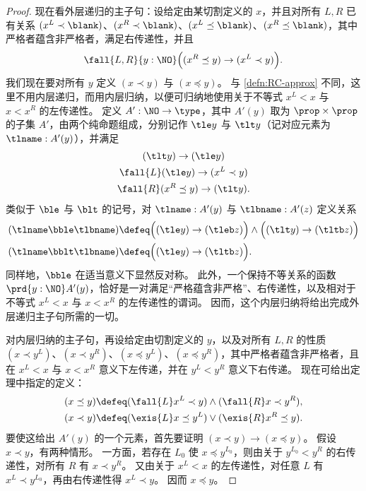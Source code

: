 \begin{proof}
  现在看外层递归的主子句：设给定由某切割定义的 $x$，并且对所有 $L,R$ 已有关系 $(x^L \prec \blank)$、$(x^R \prec \blank)$、$(x^L \preceq \blank)$、$(x^R \preceq \blank)$，其中严格者蕴含非严格者，满足右传递性，并且
  \begin{equation}\label{eq:NO-prec-outer-IH}
    \fall{L,R}{y:\NO}\Big( (x^R\preceq y) \to (x^L \prec y) \Big).
  \end{equation}
  我们现在要对所有 $y$ 定义 $(x\prec y)$ 与 $(x\preceq y)$。
  与 \cref{defn:RC-approx} 不同，这里不用内层递归，而用内层归纳，以便可归纳地使用关于不等式 $x^L<x$ 与 $x<x^R$ 的左传递性。
  定义 $A':\NO\to\type$，其中 $A'(y)$ 取为 $\prop\times\prop$ 的子集 $A'$，由两个纯命题组成，分别记作 $\tle y$ 与 $\tlt y$（记对应元素为 $\tlname:A'(y)$），并满足
  \begin{gather}
    (\tlt y) \to (\tle y)\\
    \fall{L} (\tle y)\to (x^L\prec y) \label{eq:NO-prec-IHL}\\
    \fall{R} (x^R \preceq y) \to (\tlt y) \label{eq:NO-prec-IHR}.
  \end{gather}
  类似于 $\ble$ 与 $\blt$ 的记号，对 $\tlname:A'(y)$ 与 $\tlbname:A'(z)$ 定义关系
  \begin{align*}
    (\tlname \bble \tlbname) &\defeq
    \Big((\tle y) \to (\tleb z)\Big) \land \Big((\tlt y) \to (\tltb z)\Big)\\
    (\tlname \bblt \tlbname) &\defeq
    \Big((\tle y) \to (\tltb z)\Big). %
  \end{align*}
  同样地，$\bble$ 在适当意义下显然反对称。
  此外，一个保持不等关系的函数 $\prd{y:\NO} A'(y)$，恰好是一对满足“严格蕴含非严格”、右传递性，以及相对于不等式 $x^L<x$ 与 $x<x^R$ 的左传递性的谓词。
  因而，这个内层归纳将给出完成外层递归主子句所需的一切。

  对内层归纳的主子句，再设给定由切割定义的 $y$，以及对所有 $L,R$ 的性质 $(x\prec y^L)$、$(x\prec y^R)$、$(x\preceq y^L)$、$(x\preceq y^R)$，其中严格者蕴含非严格者，且在 $x^L<x$ 与 $x<x^R$ 意义下左传递，并在 $y^L<y^R$ 意义下右传递。
  现在可给出定理中指定的定义：
  \begin{align}
    (x\preceq y) &\defeq
    (\fall{L} x^L\prec y) \land (\fall{R} x\prec y^R), \label{eq:NO-preceq-def}\\
    (x\prec y) &\defeq
    (\exis{L} x\preceq y^L) \lor (\exis{R} x^R \preceq y).\label{eq:NO-prec-def}
  \end{align}
  要使这给出 $A'(y)$ 的一个元素，首先要证明 $(x\prec y) \to (x\preceq y)$。
  假设 $x\prec y$，有两种情形。
  一方面，若存在 $L_0$ 使 $x\preceq y^{L_0}$，则由关于 $y^{L_0}<y^R$ 的右传递性，对所有 $R$ 有 $x\prec y^R$。
  又由关于 $x^L<x$ 的左传递性，对任意 $L$ 有 $x^L \prec y^{L_0}$，再由右传递性得 $x^L\prec y$。
  因而 $x\preceq y$。


\end{proof}
